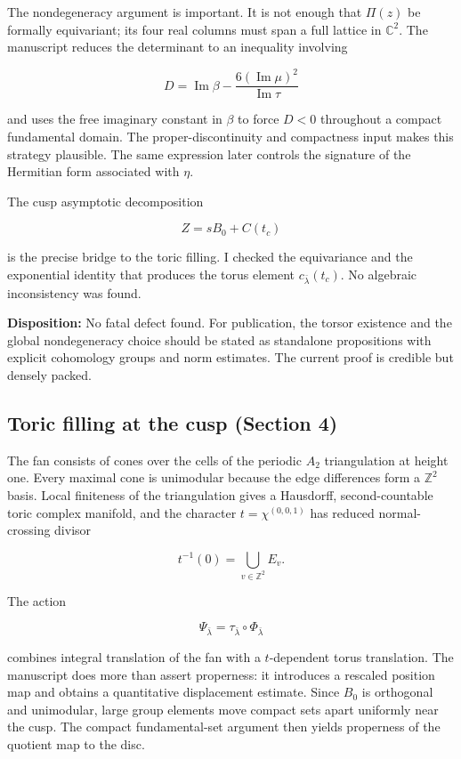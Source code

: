 \documentclass[
  10pt,
  letterpaper,
]{article}
\newcommand{\Z}{\mathbb Z}
\newcommand{\C}{\mathbb C}
\begin{document}
The nondegeneracy argument is important. It is not enough that
\(\Pi(z)\) be formally equivariant; its four real columns must span a
full lattice in \(\C^2\). The manuscript reduces the determinant to an
inequality involving

\[
D=\operatorname{Im}\beta-\frac{6(\operatorname{Im}\mu)^2}{\operatorname{Im}\tau}
\]

and uses the free imaginary constant in \(\beta\) to force \(D<0\)
throughout a compact fundamental domain. The proper-discontinuity and
compactness input makes this strategy plausible. The same expression
later controls the signature of the Hermitian form associated with
\(\eta\).

The cusp asymptotic decomposition

\[
Z=sB_0+C(t_c)
\]

is the precise bridge to the toric filling. I checked the equivariance
and the exponential identity that produces the torus element
\(c_{\bar\lambda}(t_c)\). No algebraic inconsistency was found.

\textbf{Disposition:} No fatal defect found. For publication, the torsor
existence and the global nondegeneracy choice should be stated as
standalone propositions with explicit cohomology groups and norm
estimates. The current proof is credible but densely packed.

\subsection{Toric filling at the cusp (Section
4)}\label{toric-filling-at-the-cusp-section-4}

The fan consists of cones over the cells of the periodic \(A_2\)
triangulation at height one. Every maximal cone is unimodular because
the edge differences form a \(\Z^2\) basis. Local finiteness of the
triangulation gives a Hausdorff, second-countable toric complex
manifold, and the character \(t=\chi^{(0,0,1)}\) has reduced
normal-crossing divisor

\[
t^{-1}(0)=\bigcup_{v\in\Z^2}E_v.
\]

The action

\[
\Psi_{\bar\lambda}=\tau_{\bar\lambda}\circ\Phi_{\bar\lambda}
\]

combines integral translation of the fan with a \(t\)-dependent torus
translation. The manuscript does more than assert properness: it
introduces a rescaled position map and obtains a quantitative
displacement estimate. Since \(B_0\) is orthogonal and unimodular, large
group elements move compact sets apart uniformly near the cusp. The
compact fundamental-set argument then yields properness of the quotient
map to the disc.
\end{document}
